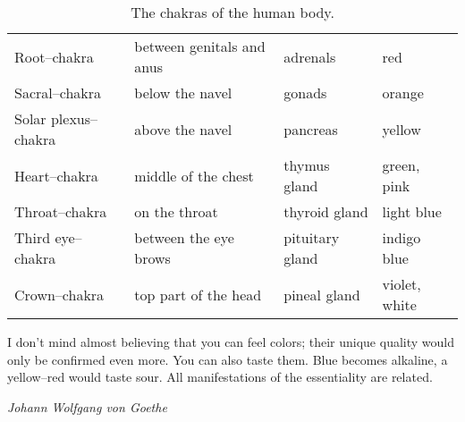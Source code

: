 \documentclass[../main.tex]{subfiles}
\begin{document}
 \begin{table}[htb]
  \centering
  \begin{tabular}{llll}
    Root--chakra & between genitals and anus & adrenals & red \\
    Sacral--chakra & below the navel & gonads & orange \\
    Solar plexus--chakra & above the navel & pancreas & yellow \\
    Heart--chakra & middle of the chest & thymus gland & green, pink \\
    Throat--chakra & on the throat & thyroid gland & light blue \\
    Third eye--chakra & between the eye brows & pituitary gland & indigo blue \\
    Crown--chakra & top part of the head & pineal gland & violet, white
  \end{tabular}
  \caption{The chakras of the human body.}
\end{table}


\epigraph{I don't mind almost believing that you can feel colors; their unique quality would only be confirmed even more. You can also taste them. Blue becomes alkaline, a yellow--red would taste sour. All manifestations of the essentiality are related.}{\textit{Johann Wolfgang von Goethe}}
\end{document}
